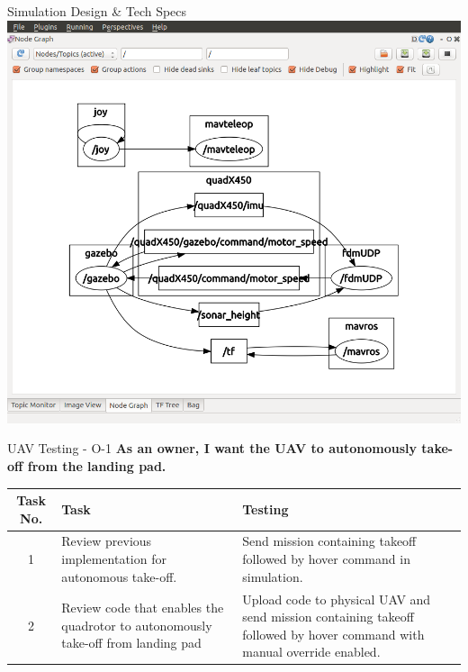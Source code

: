 \documentclass[11pt]{beamer}
\begin{document}
\begin{frame}{Simulation Design \& Tech Specs}
\includegraphics[width=1\textwidth]{images/ardusitl.png}
\end{frame}




\begin{frame}{UAV Testing - O-1}
\textbf{As an owner, I want the UAV to autonomously take-off from the landing pad.}
\begin{tabular}{| c | >{\raggedright}m{4cm} | m{4cm} | c |}\hline
	Task No. & Task & Testing\\\hline
	1 & Review previous implementation for autonomous take-off. & Send mission containing takeoff followed by hover command in simulation.\\\hline
	2 & Review code that enables the quadrotor to autonomously take-off from landing pad & Upload code to physical UAV and send mission containing takeoff followed by hover command with manual override enabled.\\\hline
\end{tabular}
\end{frame}
\end{document}
